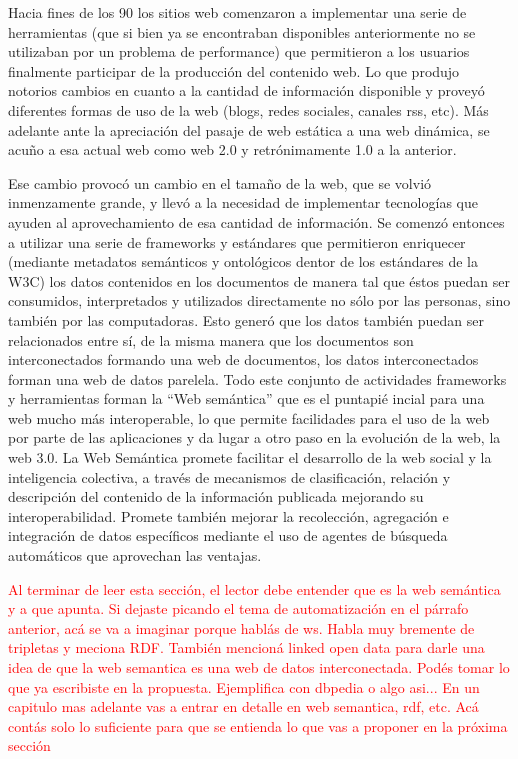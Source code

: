 Hacia fines de los 90 los sitios web comenzaron a implementar una serie de herramientas (que si bien ya se encontraban disponibles anteriormente no se utilizaban por un problema de performance) que permitieron a los usuarios finalmente participar de la producción del contenido web. Lo que produjo notorios cambios en cuanto a la cantidad de información disponible y proveyó diferentes formas de uso de la web (blogs, redes sociales, canales rss, etc). Más adelante ante la apreciación del pasaje de web estática a una web dinámica, se acuño a esa actual web como web 2.0 y retrónimamente 1.0 a la anterior.

Ese cambio provocó un cambio en el tamaño de la web, que se volvió inmenzamente grande, y llevó a la necesidad de implementar tecnologías que ayuden al aprovechamiento de esa cantidad de información. 
Se comenzó entonces a utilizar una serie de frameworks y estándares que permitieron enriquecer (mediante metadatos semánticos y ontológicos dentor de los estándares de la W3C) los datos contenidos en los documentos de manera tal que éstos puedan ser consumidos, interpretados y utilizados directamente no sólo por las personas, sino también por las computadoras.
Esto generó que los datos también puedan ser relacionados entre sí, de la misma manera que los documentos son interconectados formando una web de documentos, los datos interconectados forman una web de datos parelela.
Todo este conjunto de actividades frameworks y herramientas forman la ``Web semántica'' que es el puntapié incial para una web mucho más interoperable, lo que permite facilidades para el uso de la web por parte de las aplicaciones y da lugar a otro paso en la evolución de la web, la web 3.0. 
La Web Semántica promete facilitar el desarrollo de la web social y la inteligencia colectiva, a través de mecanismos de clasificación, relación y descripción del contenido de la información publicada mejorando su interoperabilidad. Promete también mejorar la recolección, agregación e integración de datos específicos mediante el uso de agentes de búsqueda automáticos que aprovechan las ventajas.

\begin{framed}
\textcolor{red}{Al terminar de leer esta sección, el lector debe entender que es la web semántica y a que apunta. Si dejaste picando el tema de automatización en el párrafo anterior, acá se va a imaginar porque hablás de ws. Habla muy bremente de tripletas y meciona RDF. También mencioná linked open data para darle una idea de que la web semantica es una web de datos interconectada. Podés tomar lo que ya escribiste en la propuesta. Ejemplifica con dbpedia o algo asi... En un capitulo mas adelante vas a entrar en detalle en web semantica, rdf, etc. Acá contás solo lo suficiente para que se entienda lo que vas a proponer en la próxima sección}
\end{framed}

